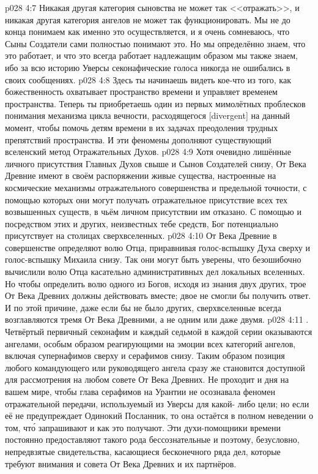\vs p028 4:7 Никакая другая категория сыновства не может так <<отражать>>, и никакая другая категория ангелов не может так функционировать. Мы не до конца понимаем как именно это осуществляется, и я очень сомневаюсь, что Сыны Создатели сами полностью понимают это. Но мы определённо знаем, что это работает, и что это всегда работает надлежащим образом мы также знаем, ибо за всю историю Уверсы секонафические голоса никогда не ошибались в своих сообщениях.
\vs p028 4:8 Здесь ты начинаешь видеть кое\hyp{}что из того, как божественность охватывает пространство времени и управляет временем пространства. Теперь ты приобретаешь один из первых мимолётных проблесков понимания механизма цикла вечности, расходящегося [divergent] на данный момент, чтобы помочь детям времени в их задачах преодоления трудных препятствий пространства. И эти феномены дополняют существующий вселенский метод Отражательных Духов.
\vs p028 4:9 Хотя очевидно лишённые личного присутствия Главных Духов свыше и Сынов Создателей снизу, От Века Древние имеют в своём распоряжении живые существа, настроенные на космические механизмы отражательного совершенства и предельной точности, с помощью которых они могут получать отражательное присутствие всех тех возвышенных существ, в чьём личном присутствии им отказано. С помощью и посредством этих и других, неизвестных тебе средств, Бог потенциально присутствует на столицах сверхвселенных.
\vs p028 4:10 От Века Древние в совершенстве определяют волю Отца, приравнивая голос\hyp{}вспышку Духа сверху и голос\hyp{}вспышку Михаила снизу. Так они могут быть уверены, что безошибочно вычислили волю Отца касательно административных дел локальных вселенных. Но чтобы определить волю одного из Богов, исходя из знания двух других, трое От Века Древних должны действовать вместе; двое не смогли бы получить ответ. И по этой причине, даже если бы не было других, сверхвселенные всегда возглавляются тремя От Века Древними, а не одним или даже двумя.
\vs p028 4:11 . Четвёртый первичный секонафим и каждый седьмой в каждой серии оказываются ангелами, особым образом реагирующими на эмоции всех категорий ангелов, включая супернафимов сверху и серафимов снизу. Таким образом позиция любого командующего или руководящего ангела сразу же становится доступной для рассмотрения на любом совете От Века Древних. Не проходит и дня на вашем мире, чтобы глава серафимов на Урантии не осознавала феномен отражательной передачи, используемый из Уверсы для какой\hyp{} либо цели; но если её не предупреждает Одинокий Посланник, то она остаётся в полном неведении о том, чт\'о запрашивают и как это получают. Эти духи\hyp{}помощники времени постоянно предоставляют такого рода бессознательные и поэтому, безусловно, непредвзятые свидетельства, касающиеся бесконечного ряда дел, которые требуют внимания и совета От Века Древних и их партнёров.
